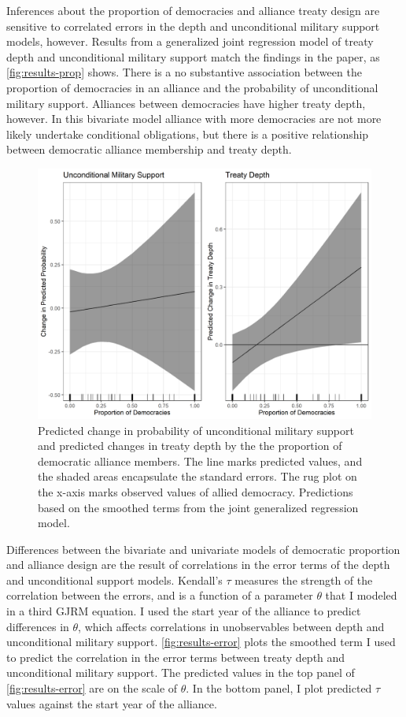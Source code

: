 \documentclass[12pt]{article}
\begin{document}
Inferences about the proportion of democracies and alliance treaty design are sensitive to correlated errors in the depth and unconditional military support models, however. 
Results from a generalized joint regression model of treaty depth and unconditional military support match the findings in the paper, as \autoref{fig:results-prop} shows. 
There is a no substantive association between the proportion of democracies in an alliance and the probability of unconditional military support. 
Alliances between democracies have higher treaty depth, however. 
In this bivariate model alliance with more democracies are not more likely undertake conditional obligations, but there is a positive relationship between democratic alliance membership and treaty depth. 


\begin{figure}
\includegraphics[width=.95\textwidth]{results-prop.png}  
\caption{Predicted change in probability of unconditional military support and predicted changes in treaty depth by the the proportion of democratic alliance members. The line marks predicted values, and the shaded areas encapsulate the standard errors. The rug plot on the x-axis marks observed values of allied democracy. Predictions based on the smoothed terms from the joint generalized regression model.}
\label{fig:results-prop}
\end{figure}



Differences between the bivariate and univariate models of democratic proportion and alliance design are the result of correlations in the error terms of the depth and unconditional support models.  
Kendall's $\tau$ measures the strength of the correlation between the errors, and is a function of a parameter $\theta$ that I modeled in a third GJRM equation.
I used the start year of the alliance to predict differences in $\theta$, which affects correlations in unobservables between depth and unconditional military support. 
\autoref{fig:results-error} plots the smoothed term I used to predict the correlation in the error terms between treaty depth and unconditional military support. 
The predicted values in the top panel of \autoref{fig:results-error} are on the scale of $\theta$. 
In the bottom panel, I plot predicted $\tau$ values against the start year of the alliance. 
\end{document}
